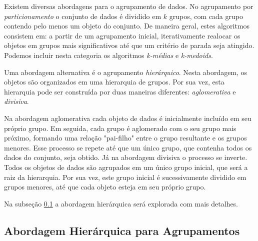 Existem diversas abordagens para o agrupamento de dados. No agrupamento por
\emph{particionamento} o conjunto de dados é dividido em $k$ grupos, com cada 
grupo contendo pelo menos um objeto do conjunto. De maneira geral, estes
algoritmos consistem em: a partir de um agrupamento inicial, iterativamente 
realocar os objetos em grupos mais significativos até que um critério de parada
seja atingido. Podemos incluir nesta categoria os algoritmos \emph{k-médias} e
\emph{k-medoids}.

Uma abordagem alternativa é o agrupamento \emph{hierárquico}. Nesta abordagem, 
os objetos são organizados em uma hierarquia de grupos. Por sua vez, esta
hierarquia pode ser construída por duas maneiras diferentes:
\emph{aglomerativa} e \emph{divisiva}.

Na abordagem aglomerativa cada objeto de dados é inicialmente incluído em seu
próprio grupo. Em seguida, cada grupo é aglomerado com o seu grupo mais próximo,
formando uma relação "pai-filho" entre o grupo resultante e os grupos menores.
Esse processo se repete até que um único grupo, que contenha todos os dados do 
conjunto, seja obtido. Já na abordagem divisiva o processo se inverte. Todos os
objetos de dados são agrupados em um único grupo inicial, que será a raiz da 
hierarquia. Por sua vez, este grupo inicial é sucessivamente dividido em grupos
menores, até que cada objeto esteja em seu próprio grupo.

Na subseção \ref{subsec:abordagem_hierarquica} a abordagem hierárquica será
explorada com mais detalhes.

\subsection{Abordagem Hierárquica para Agrupamentos}
	\label{subsec:abordagem_hierarquica}





